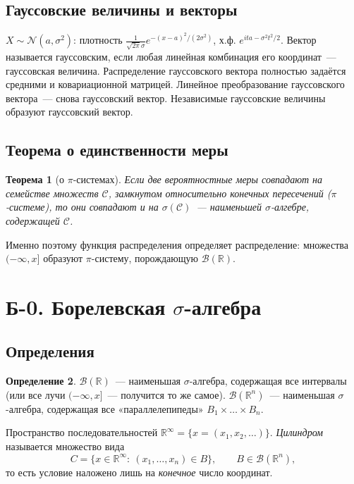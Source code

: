 \documentclass[11pt,a4paper]{article}
\newtheorem{thm}{Теорема}[section]
\theoremstyle{definition}
\newtheorem{defn}[thm]{Определение}
\newcommand{\R}{\mathbb R}
\newcommand{\B}{\mathcal B}
\newcommand{\1}{\mathbf 1}
\begin{document}
\subsection{Гауссовские величины и векторы}

$X\sim\mathcal N(a,\sigma^2)$: плотность
$\frac{1}{\sqrt{2\pi}\sigma}e^{-(x-a)^2/(2\sigma^2)}$, х.ф.
$e^{ita-\sigma^2t^2/2}$. Вектор называется гауссовским, если любая линейная
комбинация его координат~--- гауссовская величина. Распределение гауссовского
вектора полностью задаётся средними и ковариационной матрицей. Линейное
преобразование гауссовского вектора~--- снова гауссовский вектор. Независимые
гауссовские величины образуют гауссовский вектор.

\subsection{Теорема о единственности меры}

\begin{thm}[о $\pi$-системах]
Если две вероятностные меры совпадают на семействе множеств $\mathcal C$,
замкнутом относительно конечных пересечений ($\pi$-системе), то они совпадают и
на $\sigma(\mathcal C)$~--- наименьшей $\sigma$-алгебре, содержащей $\mathcal C$.
\end{thm}
Именно поэтому функция распределения определяет распределение: множества
$(-\infty,x]$ образуют $\pi$-систему, порождающую $\B(\R)$.

\section{Б-0. Борелевская $\sigma$-алгебра}

\subsection{Определения}

\begin{defn}
$\B(\R)$~--- наименьшая $\sigma$-алгебра, содержащая все интервалы (или все лучи
$(-\infty,x]$~--- получится то же самое). $\B(\R^n)$~--- наименьшая
$\sigma$-алгебра, содержащая все «параллелепипеды» $B_1\times\dots\times B_n$.
\end{defn}

Пространство последовательностей $\R^\infty=\{x=(x_1,x_2,\dots)\}$.
\emph{Цилиндром} называется множество вида
\[
C=\{x\in\R^\infty:\ (x_1,\dots,x_n)\in B\},\qquad B\in\B(\R^n),
\]
то есть условие наложено лишь на \emph{конечное} число координат.
\end{document}
